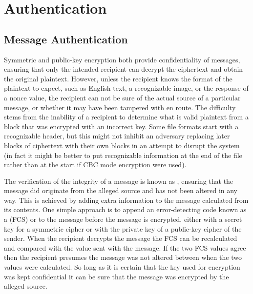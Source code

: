 
\chapter{Authentication}


\section{Message Authentication}\label{Se:MessageAuthentication}
Symmetric and public-key encryption both provide confidentiality of messages,
ensuring that only the intended recipient can decrypt the ciphertext and
obtain the original plaintext. However, unless the recipient knows the format of the
plaintext to expect, such as English text, a recognizable image,
or the response of a nonce value,
the recipient can not be sure of the actual source of a particular message,
or whether it may have been tampered with en route.
The difficulty stems from the inability of a recipient to determine what is valid plaintext
from a block that was encrypted with an incorrect key.
Some file formats start with a recognizable header, but this might not
inhibit an adversary replacing later blocks of ciphertext with their own blocks
in an attempt to disrupt the system (in fact it might be better to put recognizable
information at the end of the file rather than at the start if CBC mode encryption were used).

The verification of the integrity of a message is known as
, ensuring that the message did originate
from the alleged source and has not been altered in any way.
This is achieved by adding extra information to the message calculated from its contents.
One simple approach is to append an error-detecting code known as a
 (FCS) or  to the message before the
message is encrypted, either with a secret key for a symmetric cipher or with the private key
of a public-key cipher of the sender. When the recipient decrypts the message the FCS can be
recalculated and compared with the value sent with the message.
If the two FCS values agree then the recipient presumes the message was not
altered between when the two values were calculated.
So long as it is certain that the key used for encryption was kept confidential
it can be sure that the message was encrypted by the alleged source.

